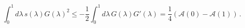 \begin{equation}
\int_0^1 d\lambda\, s(\lambda) G(\lambda)^2 \leq -\frac{1}{2} \int_0^1
d\lambda\, G(\lambda) G'(\lambda) = \frac{1}{4} \left( \mathcal{A}(0) -
\mathcal{A}(1) \right)\, .
\end{equation}

